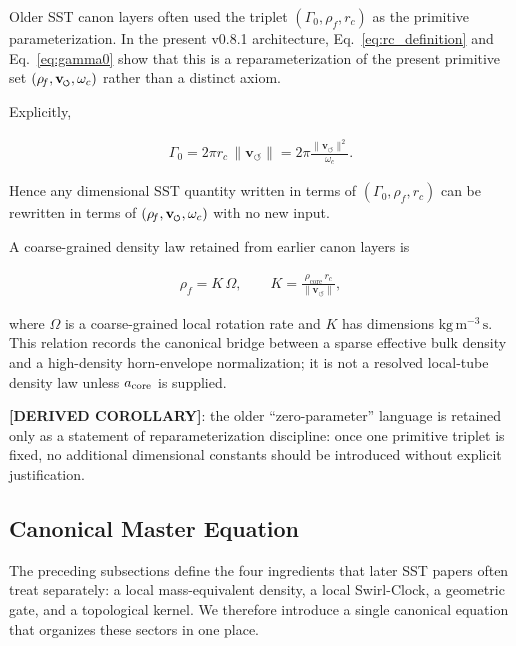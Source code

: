 \documentclass[11pt]{article}
\theoremstyle{definition}
\theoremstyle{plain}
\theoremstyle{remark}
\newcommand{\swirlarrow}{\mathchoice{\mkern-2mu\scriptstyle\boldsymbol{\circlearrowleft}}{\mkern-2mu\scriptstyle\boldsymbol{\circlearrowleft}}{\mkern-2mu\scriptscriptstyle\boldsymbol{\circlearrowleft}}{\mkern-2mu\scriptscriptstyle\boldsymbol{\circlearrowleft}}}
\newcommand{\vswirl}{\mathbf{v}_{\swirlarrow}}
\newcommand{\rhoF}{{\rho_{\!f}}}
\newcommand{\rhocore}{\rho_{\mathrm{core}}}
\newcommand{\rc}{{r_c}}
\newcommand{\vnorm}{\lVert \mathbf{v}_{\!\boldsymbol{\circlearrowleft}} \rVert}
\begin{document}
        Older SST canon layers often used the triplet $(\Gamma_0,\rhoF,\rc)$ as the primitive parameterization. In the present v0.8.1 architecture, Eq.~\eqref{eq:rc_definition} and Eq.~\eqref{eq:gamma0} show that this is a reparameterization of the present primitive set $(\rhoF,\vswirl,\omega_c)$ rather than a distinct axiom.

        Explicitly,

        \begin{align}
            \Gamma_0 = 2\pi \rc \, \vnorm
            = 2\pi \frac{\vnorm^2}{\omega_c}.
            \label{eq:gamma0_reparam}
        \end{align}

        Hence any dimensional SST quantity written in terms of $(\Gamma_0,\rhoF,\rc)$ can be rewritten in terms of $(\rhoF,\vswirl,\omega_c)$ with no new input.

        A coarse-grained density law retained from earlier canon layers is

        \begin{align}
            \rhoF = K\,\Omega,
            \qquad
            K = \frac{\rhocore \, \rc}{\vnorm},
            \label{eq:coarse_grain_density}
        \end{align}

        where $\Omega$ is a coarse-grained local rotation rate and $K$ has dimensions $\mathrm{kg\,m^{-3}\,s}$. This relation records the canonical bridge between a sparse effective bulk density and a high-density horn-envelope normalization; it is not a resolved local-tube density law unless $a_{\rm core}$ is supplied.

        \textbf{[DERIVED COROLLARY]}: the older ``zero-parameter'' language is retained only as a statement of reparameterization discipline: once one primitive triplet is fixed, no additional dimensional constants should be introduced without explicit justification.

    \subsection{Canonical Master Equation}
    \label{sec:master-equation}

        The preceding subsections define the four ingredients that later SST papers often treat separately:
        a local mass-equivalent density, a local Swirl-Clock, a geometric gate, and a topological kernel.
        We therefore introduce a single canonical equation that organizes these sectors in one place.
\end{document}
